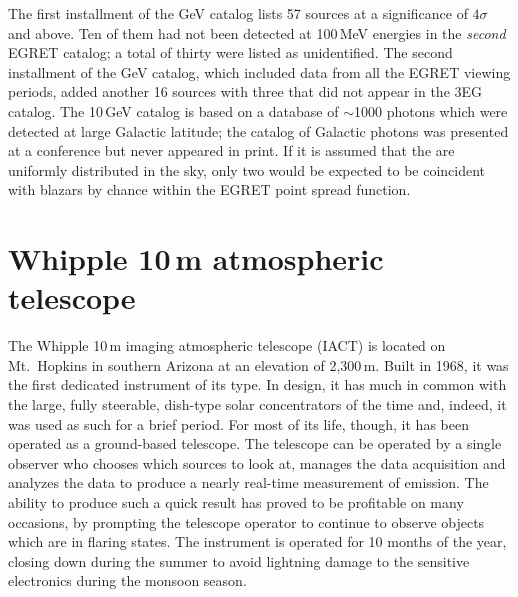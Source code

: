 The first installment of the GeV catalog lists 57 sources at a
significance of $4\sigma$ and above. Ten of them had not been detected
at 100\,MeV energies in the \textit{second} EGRET catalog; a total of
thirty were listed as unidentified. The second installment of the GeV
catalog, which included data from all the EGRET viewing periods, added
another 16 sources with three that did not appear in the 3EG
catalog. The 10\,GeV catalog is based on a database of $\sim$1000
photons which were detected at large Galactic latitude; the catalog of
Galactic photons was presented at a conference but never appeared in
print. If it is assumed that the \Grays are uniformly distributed in
the sky, only two would be expected to be coincident with blazars by
chance within the EGRET point spread function. %

\section{Whipple 10\,m atmospheric \Cerenkov telescope}
\label{SEC::INTRODUCTION::WHIPPLE}

The Whipple 10\,m imaging atmospheric \Cerenkov telescope (IACT) is
located on Mt.~Hopkins in southern Arizona at an elevation of
2,300\,m. Built in 1968, it was the first dedicated \Gray instrument
of its type. In design, it has much in common with the large, fully
steerable, dish-type solar concentrators of the time and, indeed, it
was used as such for a brief period. For most of its life, though, it
has been operated as a ground-based \Gray telescope.  The telescope
can be operated by a single observer who chooses which sources to look
at, manages the data acquisition and analyzes the data to produce a
nearly real-time measurement of \Gray emission. The ability to produce
such a quick result has proved to be profitable on many occasions, by
prompting the telescope operator to continue to observe objects which
are in flaring states. The instrument is operated for 10 months of the
year, closing down during the summer to avoid lightning damage to the
sensitive electronics during the monsoon season.

